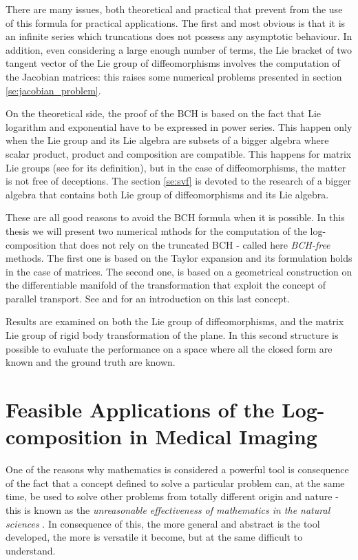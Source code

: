 There are many issues, both theoretical and practical that prevent from the use of this formula for practical applications. The first and most obvious is that it is an infinite series which truncations does not possess any asymptotic behaviour.
In addition, even considering a large enough number of terms, the Lie bracket of two tangent vector of the Lie group of diffeomorphisms involves the computation of the Jacobian matrices: this raises some numerical problems presented in section \ref{se:jacobian_problem}.

On the theoretical side, the proof of the BCH is based on the fact that Lie logarithm and exponential have to be expressed in power series. This happen only when the Lie group and its Lie algebra are subsets of a bigger algebra where scalar product, product and composition are compatible. This happens for matrix Lie groups (see \cite{hall2015lie} for its definition), but in the case of diffeomorphisms, the matter is not free of deceptions. The section \ref{se:svf} is devoted to the research of a bigger algebra that contains both Lie group of diffeomorphisms and its Lie algebra.
 
These are all good reasons to avoid the BCH formula when it is possible. In this thesis we will present two numerical mthods for the computation of the log-composition that does not rely on the truncated BCH - called here \emph{BCH-free} methods. The first one is based on the Taylor expansion and its formulation holds in the case of matrices. The second one, is based on a geometrical construction on the differentiable manifold of the transformation that exploit the concept of parallel transport. See \cite{do1976differential} and \cite{misner1973gravitation} for an introduction on this last concept.

Results are examined on both the Lie group of diffeomorphisms, and the matrix Lie group of rigid body transformation of the plane. In this second structure is possible to evaluate the performance on a space where all the closed form are known and the ground truth are known.





\section{Feasible Applications of the Log-composition in Medical Imaging}\label{se:applications_log_com_in_med}
One of the reasons why mathematics is considered a powerful tool is consequence of the fact that a concept defined to solve a particular problem can, at the same time, be used to solve other problems from totally different origin and nature - this is known as the \emph{unreasonable effectiveness of mathematics in the natural sciences} \cite{wigner1960unreasonable}. In consequence of this, the more general and abstract is the tool developed, the more is versatile it become, but at the same difficult to understand.

